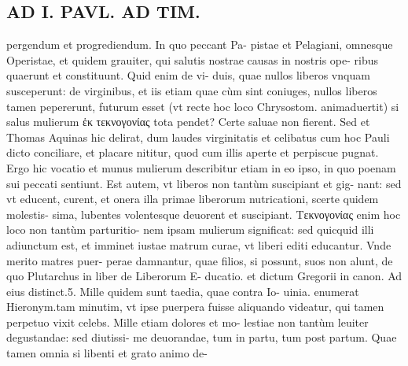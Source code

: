 \documentclass{article}
\begin{document}
\begin{pages}
\section*{AD I. PAVL. AD TIM. }
\marginpar{[ p.90 ]}\pstart pergendum et progrediendum. In quo peccant Pa- pistae et Pelagiani, omnesque Operistae, et quidem grauiter, qui salutis nostrae causas in nostris ope- ribus quaerunt et constituunt. Quid enim de vi- duis, quae nullos liberos vnquam susceperunt: de virginibus, et iis etiam quae cùm sint coniuges, nullos liberos tamen pepererunt, futurum esset (vt recte hoc loco Chrysostom. animaduertit) si salus mulierum ἑκ τεκνογονίας tota pendet? Certe saluae non fierent. Sed et Thomas Aquinas hic delirat, dum laudes virginitatis et celibatus cum hoc Pauli dicto conciliare, et placare nititur, quod cum illis aperte et perpiscue pugnat. Ergo hic vocatio et munus mulierum describitur etiam in eo ipso, in quo poenam sui peccati sentiunt. Est autem, vt liberos non tantùm suscipiant et gig- nant: sed vt educent, curent, et onera illa primae liberorum nutricationi, scerte quidem molestis- sima, lubentes volentesque deuorent et suscipiant. Tεκνογονίας enim hoc loco non tantùm parturitio- nem ipsam mulierum significat: sed quicquid illi adiunctum est, et imminet iustae matrum curae, vt liberi editi educantur. Vnde merito matres puer- perae damnantur, quae filios, si possunt, suos non alunt, de quo Plutarchus in liber  de Liberorum E- ducatio. et dictum Gregorii in canon. Ad eius distinct.5. Mille quidem sunt taedia, quae contra Io- uinia. enumerat Hieronym.tam minutim, vt ipse puerpera fuisse aliquando videatur, qui tamen perpetuo vixit celebs. Mille etiam dolores et mo- lestiae non tantùm leuiter degustandae: sed diutissi- me deuorandae, tum in partu, tum post partum. Quae tamen omnia si libenti et grato animo de-  \pend

\end{pages}
\end{document}

